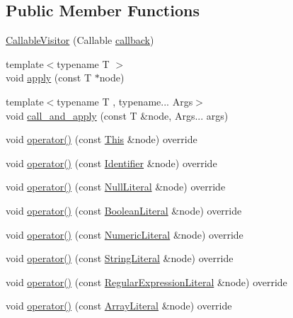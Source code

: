 \subsection*{Public Member Functions}
\begin{DoxyCompactItemize}
\item 
\hyperlink{struct_callable_visitor_af9bd3a4132494b0c91dc4f7b46e5dd0e}{Callable\+Visitor} (Callable \hyperlink{struct_callable_visitor_a52ce52c399eb34a2a16abec3361e48b8}{callback})
\item 
{\footnotesize template$<$typename T $>$ }\\void \hyperlink{struct_callable_visitor_a3a87ffcad17dec5020d4302d536761bb}{apply} (const T $\ast$node)
\item 
{\footnotesize template$<$typename T , typename... Args$>$ }\\void \hyperlink{struct_callable_visitor_a42c5d8c38a69bd7365df154e75352d68}{call\+\_\+and\+\_\+apply} (const T \&node, Args... args)
\item 
void \hyperlink{struct_callable_visitor_ac435fdf6fcab885cf21f27364883c8ad}{operator()} (const \hyperlink{structast_1_1_this}{This} \&node) override
\item 
void \hyperlink{struct_callable_visitor_a83e70f05edc12de1717db28d2cd11cd5}{operator()} (const \hyperlink{structast_1_1_identifier}{Identifier} \&node) override
\item 
void \hyperlink{struct_callable_visitor_a5bce06c30e25d3a5498bc699f6e61ecc}{operator()} (const \hyperlink{structast_1_1_null_literal}{Null\+Literal} \&node) override
\item 
void \hyperlink{struct_callable_visitor_a76ea62da5cc85a9e301f68bb61d225c7}{operator()} (const \hyperlink{structast_1_1_boolean_literal}{Boolean\+Literal} \&node) override
\item 
void \hyperlink{struct_callable_visitor_a88418c625d814fd301125a640392fead}{operator()} (const \hyperlink{structast_1_1_numeric_literal}{Numeric\+Literal} \&node) override
\item 
void \hyperlink{struct_callable_visitor_a9746653850696a2060b0c2eeff8eaa69}{operator()} (const \hyperlink{structast_1_1_string_literal}{String\+Literal} \&node) override
\item 
void \hyperlink{struct_callable_visitor_ab3c41e1fb7ac9d411e3dc7c03c936851}{operator()} (const \hyperlink{structast_1_1_regular_expression_literal}{Regular\+Expression\+Literal} \&node) override
\item 
void \hyperlink{struct_callable_visitor_a01597431529a973c356ea13809ebc001}{operator()} (const \hyperlink{structast_1_1_array_literal}{Array\+Literal} \&node) override

\end{DoxyCompactItemize}
